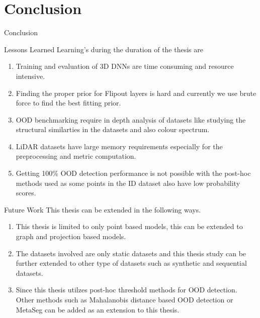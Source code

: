 \documentclass[aspectratio=169]{beamer}
\begin{document}
\section{Conclusion}
\begin{frame}{Conclusion}
    
\end{frame}
\begin{frame}{Lessons Learned}
    Learning's during the duration of the thesis are
    \begin{enumerate}
        \item Training and evaluation of 3D DNNs are time consuming and resource intensive.
        \item Finding the proper prior for Flipout layers is hard and currently we use brute force to find the best fitting prior.
        \item OOD benchmarking require in depth analysis of datasets like studying the structural similarties in the datasets and also colour spectrum.
        \item LiDAR datasets have large memory requirements especially for the preprocessing and metric computation.
        \item Getting 100\% OOD detection performance is not possible with the post-hoc methods used as some points in the ID dataset also have low probability scores.
    \end{enumerate}
\end{frame}
\begin{frame}{Future Work}
    This thesis can be extended in the following ways.
    \begin{enumerate}
        \item This thesis is limited to only point based models, this can be extended to graph and projection based models.
        \item The datasets involved are only static datasets and this thesis study can be further extended to other type of datasets such as synthetic and sequential datasets.
        \item Since this thesis utilzes post-hoc threshold methods for OOD detection. Other methods such as Mahalanobis distance based OOD detection \cite{lee2018simple_mahalanobis} or MetaSeg \cite{MetaSeg} can be added as an extension to this thesis.
    \end{enumerate}
\end{frame}
\end{document}
